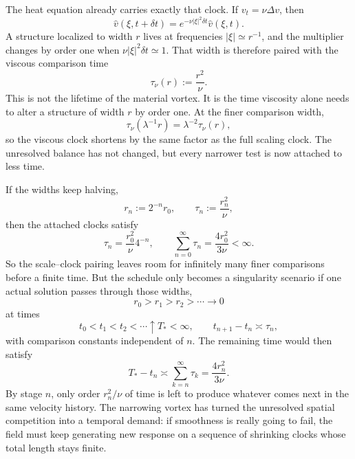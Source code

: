 
The heat equation already carries exactly that clock. If \(v_t=\nu\Delta v\), then
\[
  \widehat v(\xi,t+\delta t)
  =
  e^{-\nu|\xi|^2\delta t}\widehat v(\xi,t).
\]
A structure localized to width \(r\) lives at frequencies \(|\xi|\simeq r^{-1}\), and the multiplier changes by order one when \(\nu|\xi|^2\delta t\simeq1\). That width is therefore paired with the viscous comparison time
\[
  \tau_\nu(r)
  :=
  \frac{r^2}{\nu}.
\]
This is not the lifetime of the material vortex. It is the time viscosity alone needs to alter a structure of width \(r\) by order one. At the finer comparison width,
\[
  \tau_\nu(\lambda^{-1}r)
  =
  \lambda^{-2}\tau_\nu(r),
\]
so the viscous clock shortens by the same factor as the full \NavierStokes{} scaling clock. The unresolved balance has not changed, but every narrower test is now attached to less time.


If the widths keep halving,
\[
  r_n:=2^{-n}r_0,
  \qquad
  \tau_n:=\frac{r_n^2}{\nu},
\]
then the attached clocks satisfy
\[
  \tau_n
  =
  \frac{r_0^2}{\nu}4^{-n},
  \qquad
  \sum_{n=0}^{\infty}\tau_n
  =
  \frac{4r_0^2}{3\nu}
  <
  \infty.
\]
So the scale--clock pairing leaves room for infinitely many finer comparisons before a finite time. But the schedule only becomes a singularity scenario if one actual solution passes through those widths,
\[
  r_0>r_1>r_2>\cdots\longrightarrow0
\]
at times
\[
  t_0<t_1<t_2<\cdots\uparrow T_*<\infty,
  \qquad
  t_{n+1}-t_n\asymp\tau_n,
\]
with comparison constants independent of \(n\). The remaining time would then satisfy
\[
  T_*-t_n
  \asymp
  \sum_{k=n}^{\infty}\tau_k
  =
  \frac{4r_n^2}{3\nu}.
\]
By stage \(n\), only order \(r_n^2/\nu\) of time is left to produce whatever comes next in the same velocity history. The narrowing vortex has turned the unresolved spatial competition into a temporal demand: if smoothness is really going to fail, the field must keep generating new response on a sequence of shrinking clocks whose total length stays finite.

